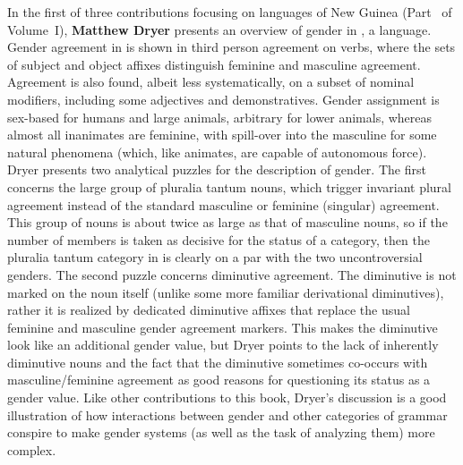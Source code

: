 \documentclass[output=collectionpaper]{langsci/langscibook}
\begin{document}
In the first of three contributions focusing on languages of New Guinea (Part~\ptnewguinea{} of Volume~I), \textbf{Matthew Dryer} presents an overview of gender in , a  language. Gender agreement in  is shown in third person agreement on verbs, where the sets of subject and object affixes distinguish feminine and masculine agreement. Agreement is also found, albeit less systematically, on a subset of nominal modifiers, including some adjectives and demonstratives. Gender assignment is sex-based for humans and large animals, arbitrary for lower animals, whereas almost all inanimates are feminine, with spill-over into the masculine for some natural phenomena (which, like animates, are capable of autonomous force). Dryer presents two analytical puzzles for the description of  gender. The first concerns the large group of pluralia tantum nouns, which trigger invariant plural agreement instead of the standard masculine or feminine (singular) agreement. This group of nouns is about twice as large as that of masculine nouns, so if the number of members is taken as decisive for the status of a category, then the pluralia tantum category in  is clearly on a par with the two uncontroversial genders. The second puzzle concerns diminutive agreement. The  diminutive is not marked on the noun itself (unlike some more familiar derivational diminutives), rather it is realized by dedicated diminutive affixes that replace the usual feminine and masculine gender agreement markers. This makes the diminutive look like an additional gender value, but Dryer points to the lack of inherently diminutive nouns and the fact that the diminutive sometimes co-occurs with masculine/feminine agreement as good reasons for questioning its status as a gender value. Like other contributions to this book, Dryer’s discussion is a good illustration of how interactions between gender and other categories of grammar conspire to make gender systems (as well as the task of analyzing them) more complex.
\end{document}
